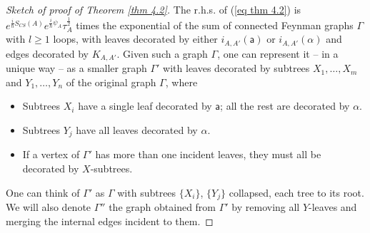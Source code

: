 \documentclass[11pt,a4paper]{amsart}
\theoremstyle{plain} %
\theoremstyle{definition}
\theoremstyle{remark}
\newcommand{\mr}{\mathrm}
\newcommand{\sfa}{\mathsf{a}}
\newcommand{\til}{\widetilde}
\begin{document}
{

\begin{proof}[Sketch of proof of Theorem \ref{thm 4.2}]
The r.h.s. of (\ref{eq thm 4.2}) is $e^{\frac{i}{\hbar}S_{CS}(A)}  e^{\frac{i}{\hbar}\psi_{A}}\tau_{A}^\frac12$ times 
 the exponential of the sum of connected Feynman graphs $\Gamma$ with $l\geq 1$ loops, with leaves decorated by either $i_{A,A'}(\sfa)$ or $i_{A,A'}(\alpha)$ and edges decorated by $K_{A,A'}$. Given such a graph $\Gamma$, one can represent it -- in a unique way -- as a smaller graph $\Gamma'$ with leaves decorated by subtrees $X_1,\ldots,X_m$ and $Y_1,\ldots,Y_n$ of the original graph $\Gamma$, where
 \begin{itemize}
     \item Subtrees $X_i$ have a single leaf decorated by $\sfa$; all the rest are decorated by $\alpha$.
     \item Subtrees $Y_j$ have all leaves decorated by $\alpha$.
     \item If a vertex of $\Gamma'$ has more than one incident leaves, they must all be decorated by $X$-subtrees. 
 \end{itemize}
 One can think of $\Gamma'$ as $\Gamma$ with subtrees $\{X_i\}$, $\{Y_j\}$ collapsed, each tree to its root. We will also denote $\Gamma''$ the graph obtained from $\Gamma'$ by removing all $Y$-leaves and merging the internal edges incident to them.


\end{proof}}
\end{document}
